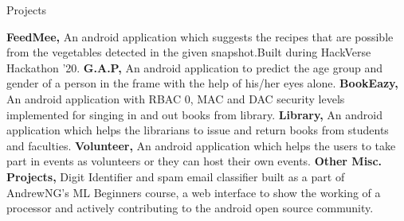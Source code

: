 \begin{rubric}{Projects}

\entry* \textbf{FeedMee,} An android application which suggests the recipes that are possible from the vegetables detected in the given snapshot.Built during HackVerse Hackathon '20.  
\entry* \textbf{G.A.P,} An android application to predict the age group and gender of a person in the frame with the help of his/her eyes alone.
\entry* \textbf{BookEazy,} An android application with RBAC 0, MAC and DAC security levels implemented for singing in and out books from library. 
\entry* \textbf{Library,} An android application which helps the librarians to issue and return books from students and faculties.
\entry* \textbf{Volunteer,} An android application which helps the users to take part in events as volunteers or they can host their own events.
\entry* \textbf{Other Misc. Projects,} Digit Identifier and spam email classifier built as a part of AndrewNG's ML Beginners course, a web interface to show the working of a processor and actively contributing to the android open source community.
\end{rubric}